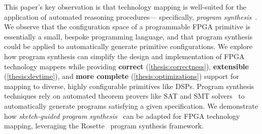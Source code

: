 This paper's
  key observation is that 
  technology mapping
  is well-suited for the application
  of automated reasoning procedures---%
  specifically,
  \textit{program synthesis}~\cite{gulwani2017program}.
We observe that 
  the configuration space of
  a programmable FPGA primitive
  is essentially a small, bespoke
  programming language,
  and that
  program synthesis
  could be applied
  to automatically generate
  primitive configurations.
We explore how
  program synthesis
  can simplify the design and implementation of
  FPGA technology mappers while providing
  \textbf{correct} (\cref{thesis:correctness}),
  \textbf{extensible} (\cref{thesis:devtime}), and
  \textbf{more complete}
  (\cref{thesis:optimizations})
  support for mapping to 
  diverse, highly configurable primitives
  like DSPs.
Program synthesis techniques rely on
  automated theorem provers like
  SAT and SMT solvers~\cite{de2008z3, barbosa2022cvc5}
  to automatically generate programs
  satisfying a given specification.
We demonstrate how
 \textit{sketch-guided program synthesis}~\cite{solar2008program}
  can be adapted
  for FPGA technology mapping,
  leveraging the
  Rosette~\cite{torlak2014lightweight} 
  program synthesis framework.



